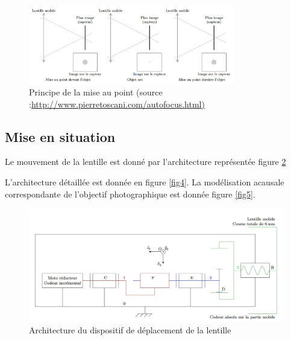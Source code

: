 \begin{figure}[!htb]
\begin{center}
\includegraphics[width=0.8\textwidth]{images/image_fig2.jpg}
\caption{Principe de la mise au point (source :\url{http://www.pierretoscani.com/autofocus.html)} \label{fig2}}
\end{center}
\end{figure}


\subsection{Mise en situation}\label{mise-en-situation}


Le mouvement de la lentille est donné par l'architecture représentée
figure \ref{fig3}

L'architecture détaillée est donnée en figure \ref{fig4}. La modélisation acausale
correspondante de l'objectif photographique est donnée figure \ref{fig5}.

\begin{figure}[!htb]
\begin{center}
\includegraphics[width=1.0\textwidth]{images/image_fig3.jpg}
\caption{Architecture du dispositif de déplacement de la lentille \label{fig3}}
\end{center}
\end{figure}

